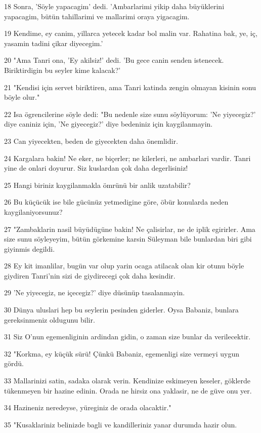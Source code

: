 \par 18 Sonra, 'Söyle yapacagim' dedi. 'Ambarlarimi yikip daha büyüklerini yapacagim, bütün tahillarimi ve mallarimi oraya yigacagim.
\par 19 Kendime, ey canim, yillarca yetecek kadar bol malin var. Rahatina bak, ye, iç, yasamin tadini çikar diyecegim.'
\par 20 "Ama Tanri ona, 'Ey akilsiz!' dedi. 'Bu gece canin senden istenecek. Biriktirdigin bu seyler kime kalacak?'
\par 21 "Kendisi için servet biriktiren, ama Tanri katinda zengin olmayan kisinin sonu böyle olur."
\par 22 Isa ögrencilerine söyle dedi: "Bu nedenle size sunu söylüyorum: 'Ne yiyecegiz?' diye caniniz için, 'Ne giyecegiz?' diye bedeniniz için kaygilanmayin.
\par 23 Can yiyecekten, beden de giyecekten daha önemlidir.
\par 24 Kargalara bakin! Ne eker, ne biçerler; ne kilerleri, ne ambarlari vardir. Tanri yine de onlari doyurur. Siz kuslardan çok daha degerlisiniz!
\par 25 Hangi biriniz kaygilanmakla ömrünü bir anlik uzatabilir?
\par 26 Bu küçücük ise bile gücünüz yetmedigine göre, öbür konularda neden kaygilaniyorsunuz?
\par 27 "Zambaklarin nasil büyüdügüne bakin! Ne çalisirlar, ne de iplik egirirler. Ama size sunu söyleyeyim, bütün görkemine karsin Süleyman bile bunlardan biri gibi giyinmis degildi.
\par 28 Ey kit imanlilar, bugün var olup yarin ocaga atilacak olan kir otunu böyle giydiren Tanri'nin sizi de giydirecegi çok daha kesindir.
\par 29 'Ne yiyecegiz, ne içecegiz?' diye düsünüp tasalanmayin.
\par 30 Dünya uluslari hep bu seylerin pesinden giderler. Oysa Babaniz, bunlara gereksinmeniz oldugunu bilir.
\par 31 Siz O'nun egemenliginin ardindan gidin, o zaman size bunlar da verilecektir.
\par 32 "Korkma, ey küçük sürü! Çünkü Babaniz, egemenligi size vermeyi uygun gördü.
\par 33 Mallarinizi satin, sadaka olarak verin. Kendinize eskimeyen keseler, göklerde tükenmeyen bir hazine edinin. Orada ne hirsiz ona yaklasir, ne de güve onu yer.
\par 34 Hazineniz neredeyse, yüreginiz de orada olacaktir."
\par 35 "Kusaklariniz belinizde bagli ve kandilleriniz yanar durumda hazir olun.

